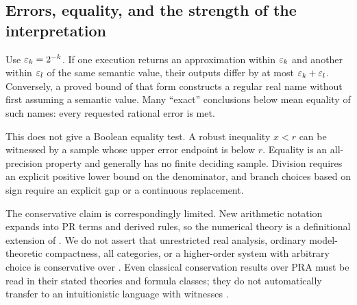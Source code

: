 \subsection{Errors, equality, and the strength of the interpretation}

Use \(\varepsilon_k=2^{-k}\). If one execution returns an approximation within \(\varepsilon_k\) and another within \(\varepsilon_l\) of the same semantic value, their outputs differ by at most \(\varepsilon_k+\varepsilon_l\). Conversely, a proved bound of that form constructs a regular real name without first assuming a semantic value. Many ``exact'' conclusions below mean equality of such names: every requested rational error is met.

This does not give a Boolean equality test. A robust inequality \(x<r\) can be witnessed by a sample whose upper error endpoint is below \(r\). Equality is an all-precision property and generally has no finite deciding sample. Division requires an explicit positive lower bound on the denominator, and branch choices based on sign require an explicit gap or a continuous replacement.

The conservative claim is correspondingly limited. New arithmetic notation expands into PR terms and derived rules, so the numerical theory is a definitional extension of \ipra. We do not assert that unrestricted real analysis, ordinary model-theoretic compactness, all categories, or a higher-order system with arbitrary choice is conservative over \ipra. Even classical conservation results over PRA must be read in their stated theories and formula classes; they do not automatically transfer to an intuitionistic language with witnesses \cite{kohlenbach}.
